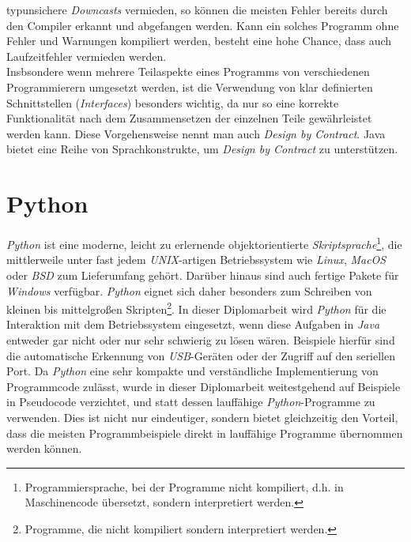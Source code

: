         typunsichere \emph{Downcasts} vermieden, so können die meisten Fehler bereits durch den Compiler erkannt und 
        abgefangen werden. Kann ein solches Programm ohne Fehler und Warnungen kompiliert werden, besteht eine hohe Chance,
        dass auch Laufzeitfehler vermieden werden.\\
        Insbsondere wenn mehrere Teilaspekte eines Programms von verschiedenen Programmierern umgesetzt werden, 
        ist die Verwendung von klar definierten Schnittstellen (\emph{Interfaces}) besonders wichtig, da nur so eine korrekte
        Funktionalität nach dem Zusammensetzen der einzelnen Teile gewährleistet werden kann. Diese Vorgehensweise nennt
        man auch \emph{Design by Contract}. Java bietet eine Reihe von Sprachkonstrukte, um \emph{Design by Contract}
        zu unterstützen.

\section{Python}
    \emph{Python} ist eine moderne, leicht zu erlernende objektorientierte \emph{Skriptsprache}\footnote{Programmiersprache,
        bei der Programme nicht kompiliert, d.h. in Maschinencode übersetzt, sondern interpretiert werden.}, die mittlerweile 
    unter fast jedem \emph{UNIX}-artigen Betriebssystem wie \emph{Linux}, \emph{MacOS} oder \emph{BSD} zum Lieferumfang 
    gehört. Darüber hinaus sind auch fertige Pakete für \emph{Windows} verfügbar. \emph{Python} eignet sich daher 
    besonders zum Schreiben von kleinen
    bis mittelgroßen Skripten\footnote{Programme, die nicht kompiliert sondern interpretiert werden.}. In dieser Diplomarbeit wird \emph{Python} für die Interaktion mit dem Betriebssystem
    eingesetzt, wenn diese Aufgaben in \emph{Java} entweder gar nicht oder nur sehr schwierig zu lösen wären. Beispiele
    hierfür sind die automatische Erkennung von \emph{USB}-Geräten oder der Zugriff auf den seriellen Port.
    Da \emph{Python} eine sehr kompakte und verständliche Implementierung von Programmcode zulässt, wurde in dieser
    Diplomarbeit weitestgehend auf Beispiele in Pseudocode verzichtet, und statt dessen lauffähige
    \emph{Python}-Programme zu verwenden. Dies ist nicht nur eindeutiger, sondern bietet gleichzeitig den Vorteil,
    dass die meisten Programmbeispiele direkt in lauffähige Programme übernommen werden können.

